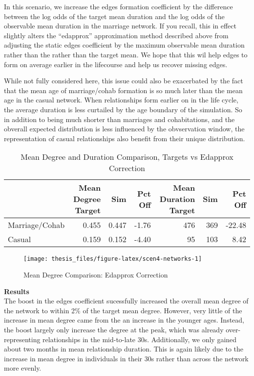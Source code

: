 \documentclass [11pt, proquest] {uwthesis}[2015/03/03]
\begin{document}
In this scenario, we increase the edges formation coefficient by the
difference between the log odds of the target mean duration and the log
odds of the observable mean duration in the marriage network. If you
recall, this in effect slightly alters the ``edapprox'' approximation
method described above from adjusting the static edges coefficient by
the maximum observable mean duration rather than the rather than the
target mean. We hope that this wil help edges to form on average earlier
in the lifecourse and help us recover missing edges.

While not fully considered here, this issue could also be exacerbated by
the fact that the mean age of marriage/cohab formation is so much later
than the mean age in the casual network. When relationships form earlier
on in the life cycle, the average duration is less curtailed by the age
boundary of the simulation. So in addition to being much shorter than
marriages and cohabitations, and the obverall expected distribution is
less influenced by the obvservation window, the representation of casual
relationships also benefit from their unique distribution.
\begin{table}

\caption{\label{tab:scen4-tab}Mean Degree and Duration Comparison, Targets vs Edapprox Correction}
\centering
\begin{tabular}[t]{lrrrrrr}
\toprule
  & Mean Degree Target & Sim & Pct Off & Mean Duration Target & Sim & Pct Off\\
\midrule
Marriage/Cohab & 0.455 & 0.447 & -1.76 & 476 & 369 & -22.48\\
Casual & 0.159 & 0.152 & -4.40 & 95 & 103 & 8.42\\
\bottomrule
\end{tabular}
\end{table}
\begin{figure}

{\centering \texttt{[image: thesis\_files/figure-latex/scen4-networks-1]} 

}

\caption{Mean Degree Comparison: Edapprox Correction}\label{fig:scen4-networks}
\end{figure}
\textbf{Results}\\
The boost in the edges coefficient sucessfully increased the overall
mean degree of the network to within 2\% of the target mean degree.
However, very little of the increase in mean degree came from the an
increase in the younger ages. Instead, the boost largely only increase
the degree at the peak, which was already over-representing
relationships in the mid-to-late 30s. Additionally, we only gained about
two months in mean relationship duration. This is again likely due to
the increase in mean degree in individuals in their 30s rather than
across the network more evenly.
\end{document}
